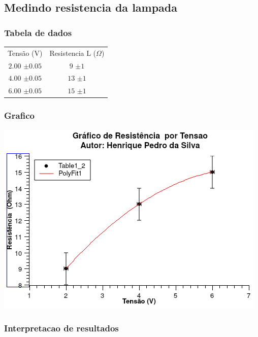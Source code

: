 \documentclass[12pt,twoside, a4paper, twocolumn]{article}
\begin{document}
\subsection{Medindo resistencia da lampada}

\subsubsection{Tabela de dados}

\begin{center}
    \begin{tabular}{ |cc| }
        \hline
        Tensão (V)       & Resistencia L ($\varOmega$) \\
        $2.00$ $\pm0.05$ & $9$ $\pm1$                  \\
        $4.00$ $\pm0.05$ & $13$ $\pm1$                 \\
        $6.00$ $\pm0.05$ & $15$ $\pm1$                 \\
        \hline
    \end{tabular}
\end{center}

\subsubsection{Grafico}

\begin{adjustbox}{scale=0.70}
    \includegraphics{Graph2.png}
\end{adjustbox}

\subsubsection{Interpretacao de resultados}
\end{document}
